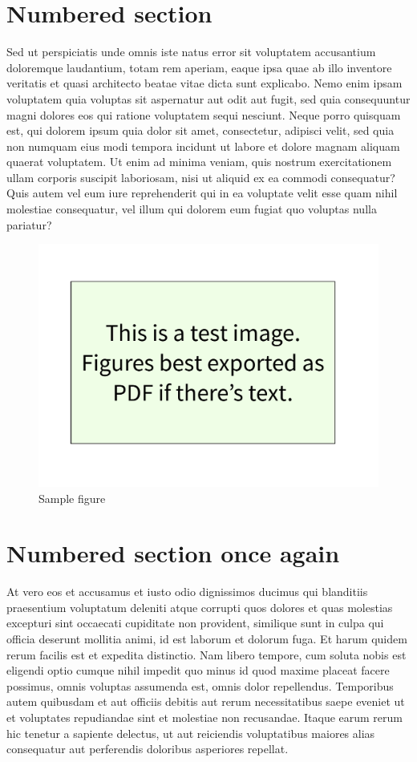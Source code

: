 \documentclass[12pt]{article}
\begin{document}
\section{Numbered section}
Sed ut perspiciatis unde omnis iste natus error sit voluptatem accusantium doloremque laudantium, totam rem aperiam, eaque ipsa quae ab illo inventore veritatis et quasi architecto beatae vitae dicta sunt explicabo. Nemo enim ipsam voluptatem quia voluptas sit aspernatur aut odit aut fugit, sed quia consequuntur magni dolores eos qui ratione voluptatem sequi nesciunt. Neque porro quisquam est, qui dolorem ipsum quia dolor sit amet, consectetur, adipisci velit, sed quia non numquam eius modi tempora incidunt ut labore et dolore magnam aliquam quaerat voluptatem. Ut enim ad minima veniam, quis nostrum exercitationem ullam corporis suscipit laboriosam, nisi ut aliquid ex ea commodi consequatur? Quis autem vel eum iure reprehenderit qui in ea voluptate velit esse quam nihil molestiae consequatur, vel illum qui dolorem eum fugiat quo voluptas nulla pariatur?

\begin{figure}[ht]
\centering
\includegraphics[width=6in]{images/template.pdf}
\caption{Sample figure}
\label{fig:sample-fig}
\end{figure}

\section{Numbered section once again}
At vero eos et accusamus et iusto odio dignissimos ducimus qui blanditiis praesentium voluptatum deleniti atque corrupti quos dolores et quas molestias excepturi sint occaecati cupiditate non provident, similique sunt in culpa qui officia deserunt mollitia animi, id est laborum et dolorum fuga. Et harum quidem rerum facilis est et expedita distinctio. Nam libero tempore, cum soluta nobis est eligendi optio cumque nihil impedit quo minus id quod maxime placeat facere possimus, omnis voluptas assumenda est, omnis dolor repellendus. Temporibus autem quibusdam et aut officiis debitis aut rerum necessitatibus saepe eveniet ut et voluptates repudiandae sint et molestiae non recusandae. Itaque earum rerum hic tenetur a sapiente delectus, ut aut reiciendis voluptatibus maiores alias consequatur aut perferendis doloribus asperiores repellat.
\end{document}
